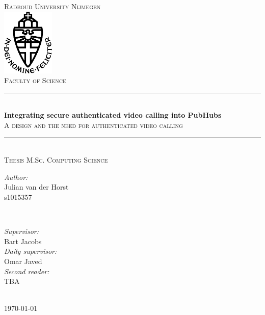 \documentclass{report}
\title{\thesistitle}
\author{\thesisauthorfirst\space\thesisauthorsecond}
\date{\thesisdate}
\newcommand{\thesistitle}{Integrating secure authenticated video calling into PubHubs}
\newcommand{\thesissubtitle}{A design and the need for authenticated video calling}
\newcommand\thesisauthorfirst{Julian van der Horst \\ s1015357}
\newcommand\thesisauthorsecond{}
\newcommand\thesissupervisorfirst{Bart Jacobs}
\newcommand\thesissupervisorsecond{Omar Javed}
\newcommand\thesissecondreaderfirst{TBA}
\newcommand\thesissecondreadersecond{Bram Westerbaan}
\newcommand\thesisdate{Febrauri 2024}
\begin{document}
\begin{titlepage}
\thispagestyle{empty}
\newcommand{\HRule}{\rule{\linewidth}{0.5mm}}
\center
\textsc{\Large Radboud University Nijmegen}\\[.7cm]
\includegraphics[width=25mm]{img/in_dei_nomine_feliciter}\\[.5cm]
\textsc{Faculty of Science}\\[0.5cm]

\HRule \\[0.4cm]
{ \huge \bfseries \thesistitle}\\[0.1cm]
\textsc{\thesissubtitle}\\
\HRule \\[.5cm]
\textsc{\large Thesis M.Sc. Computing Science}\\[.5cm]

\begin{minipage}{0.4\textwidth}
    \begin{flushleft}
        \large
        \emph{Author:}\\
        \thesisauthorfirst\space \textsc{\thesisauthorsecond}
    \end{flushleft}
\end{minipage}
~
\begin{minipage}{0.4\textwidth}
    \begin{flushright}
        \large
        \emph{Supervisor:} \\
        \thesissupervisorfirst  \\[1em]
        \emph{Daily supervisor:} \\
        \thesissupervisorsecond \\[1em]
        \emph{Second reader:} \\
        \thesissecondreaderfirst\\
    \end{flushright}
\end{minipage}\\[4cm]
\vfill
{\large \today}\\
\clearpage
\end{titlepage}
\end{document}
